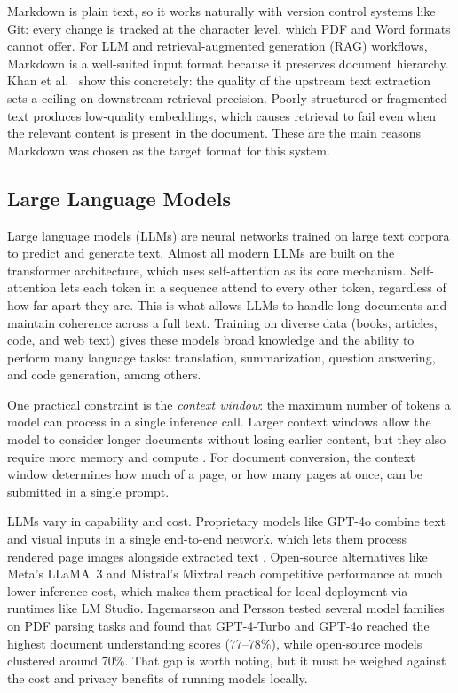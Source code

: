 \documentclass[12pt]{article}
\begin{document}
Markdown is plain text, so it works naturally with version control systems like
Git: every change is tracked at the character level, which PDF and Word formats
cannot offer. For LLM and retrieval-augmented generation (RAG) workflows,
Markdown is a well-suited input format because it preserves document hierarchy.
Khan et al.\ \cite{khan2024} show this concretely: the quality of the upstream
text extraction sets a ceiling on downstream retrieval precision. Poorly
structured or fragmented text produces low-quality embeddings, which causes
retrieval to fail even when the relevant content is present in the document.
These are the main reasons Markdown was chosen as the target format for this
system.

\subsection{Large Language Models}

Large language models (LLMs) are neural networks trained on large text corpora
to predict and generate text. Almost all modern LLMs are built on the
transformer architecture, which uses self-attention as its core mechanism.
Self-attention lets each token in a sequence attend to every other token,
regardless of how far apart they are. This is what allows LLMs to handle long
documents and maintain coherence across a full text. Training on diverse data (books, articles, code, and web text) gives these
models broad knowledge
and the ability to perform many language tasks: translation, summarization,
question answering, and code generation, among others.

One practical constraint is the \textit{context window}: the maximum number of
tokens a model can process in a single inference call. Larger context windows
allow the model to consider longer documents without losing earlier content, but
they also require more memory and compute \cite{ingemarsson2024}. For document
conversion, the context window determines how much of a page, or how many pages at once,
can be submitted in a single prompt.

LLMs vary in capability and cost. Proprietary models like GPT-4o combine text
and visual inputs in a single end-to-end network, which lets them process
rendered page images alongside extracted text \cite{ingemarsson2024}.
Open-source alternatives like Meta's LLaMA~3 and Mistral's Mixtral reach
competitive performance at much lower inference cost, which makes them
practical for local deployment via runtimes like LM Studio. Ingemarsson and
Persson \cite{ingemarsson2024} tested several model families on PDF parsing
tasks and found that GPT-4-Turbo and GPT-4o reached the highest document
understanding scores (77--78\%), while open-source models clustered around
70\%. That gap is worth noting, but it must be weighed against the cost and
privacy benefits of running models locally.
\end{document}
